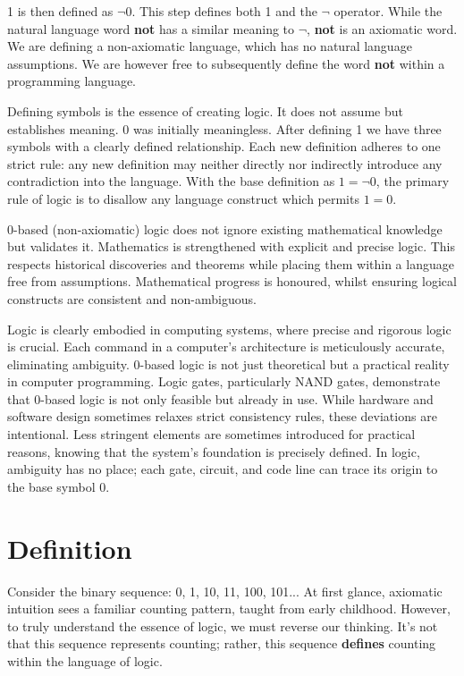 \documentclass{article}
\begin{document}
1 is then defined as $\neg 0$. This step defines both 1 and the $\neg$ operator. While the natural language word \textbf{not} has a similar meaning to $\neg$, \textbf{not} is an axiomatic word. We are defining a non-axiomatic language, which has no natural language assumptions. We are however free to subsequently define the word \textbf{not} within a programming language. 

Defining symbols is the essence of creating logic. It does not assume but establishes meaning. 0 was initially meaningless. After defining 1 we have three symbols with a clearly defined relationship. Each new definition adheres to one strict rule: any new definition may neither directly nor indirectly introduce any contradiction into the language. With the base definition as $1=\neg 0$, the primary rule of logic is to disallow any language construct which permits $1=0$.

0-based (non-axiomatic) logic does not ignore existing mathematical knowledge but validates it. Mathematics is strengthened with explicit and precise logic. This respects historical discoveries and theorems while placing them within a language free from assumptions. Mathematical progress is honoured, whilst ensuring logical constructs are consistent and non-ambiguous.

Logic is clearly embodied in computing systems, where precise and rigorous logic is crucial. Each command in a computer's architecture is meticulously accurate, eliminating ambiguity. 0-based logic is not just theoretical but a practical reality in computer programming. Logic gates, particularly NAND gates, demonstrate that 0-based logic is not only feasible but already in use. While hardware and software design sometimes relaxes strict consistency rules, these deviations are intentional. Less stringent elements are sometimes introduced for practical reasons, knowing that the system's foundation is precisely defined. In logic, ambiguity has no place; each gate, circuit, and code line can trace its origin to the base symbol 0.

\section*{Definition}

Consider the binary sequence: 0, 1, 10, 11, 100, 101... At first glance, axiomatic intuition sees a familiar counting pattern, taught from early childhood. However, to truly understand the essence of logic, we must reverse our thinking. It's not that this sequence represents counting; rather, this sequence \textbf{defines} counting within the language of logic.
\end{document}
